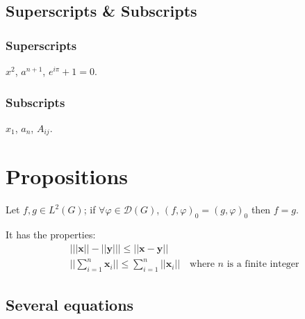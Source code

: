 \documentclass[
12pt, %
a4paper, %
fleqn,   %
]{notes}
\begin{document}
\subsection{Superscripts \& Subscripts}


\subsubsection{Superscripts}
$x^2$, $a^{n+1}$, $e^{i\pi} + 1 = 0$.


\subsubsection{Subscripts}
$x_1$, $a_{n}$, $A_{ij}$.


\newpage
\section{Propositions}

\begin{proposition}
    Let $f,g\in L^2(G)$; if $\forall \varphi\in\mathcal{D}(G)$,
    $(f,\varphi)_0=(g,\varphi)_0$ then $f = g$.
\end{proposition}

\begin{proposition}
    It has the properties:
    \begin{align}
        & \big| ||\mathbf{x}|| - ||\mathbf{y}|| \big|\leq || \mathbf{x}-
        \mathbf{y}|| \\
        &  ||\sum_{i=1}^n\mathbf{x}_i||\leq
        \sum_{i=1}^n||\mathbf{x}_i||\quad\text{where $n$ is a finite integer}
    \end{align}
\end{proposition}


\subsection{Several equations}
\end{document}
